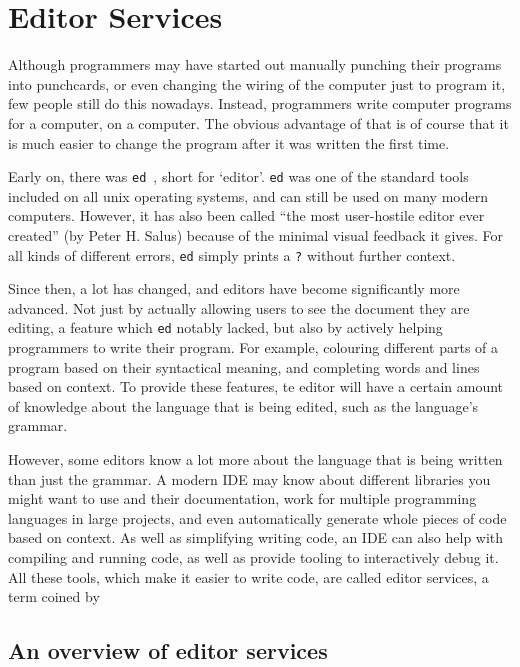 

\chapter{Editor Services}
\label{chap:editor-services}

Although programmers may have started out manually punching their programs into punchcards,
or even changing the wiring of the computer just to program it, few people still do this nowadays.
Instead, programmers write computer programs for a computer, on a computer.
The obvious advantage of that is of course that it is much easier to change the program after
it was written the first time.

Early on, there was \texttt{ed}~\autocite{ed}, short for `editor'.
\texttt{ed} was one of the standard tools included on all unix operating systems, and can still be used on many modern computers.
However, it has also been called ``the most user-hostile editor ever created'' (by Peter H. Salus) because of the
minimal visual feedback it gives.
For all kinds of different errors, \texttt{ed} simply prints a \texttt{?} without further context.

Since then, a lot has changed, and editors have become significantly more advanced.
Not just by actually allowing users to see the document they are editing, a feature which \texttt{ed} notably lacked,
but also by actively helping programmers to write their program.
For example, colouring different parts of a program based on their syntactical meaning, and completing words and lines based on context.
To provide these features, te editor will have a certain amount of knowledge about the language that is being edited, such as the language's grammar.

However, some editors know a lot more about the language that is being written than just the grammar.
A modern \ac{IDE} may know about different libraries you might want to use and their documentation,
work for multiple programming languages in large projects, and even automatically generate whole pieces of code based on context.
As well as simplifying writing code, an \ac{IDE} can also help with compiling and running code, as well as provide tooling to interactively debug it.
All these tools, which make it easier to write code, are called editor services, a term coined by \textcite{KatsKV08}

\section{An overview of editor services}\label{sec:an-overview-of-editor-services}

